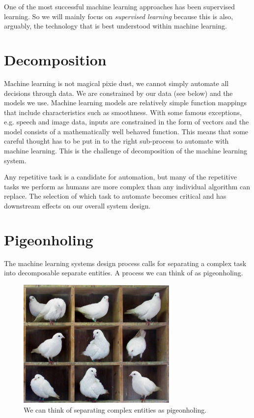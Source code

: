 \documentclass[a4paper]{caesar_book}
\begin{document}
One of the most successful machine learning approaches has been supervised learning. So we will mainly focus on \textit{supervised learning} because this is also, arguably, the technology that is best understood within machine learning.

\section{Decomposition}

Machine learning is not magical pixie dust, we cannot simply automate all decisions through data. We are constrained by our data (see below) and the models we use. Machine learning models are relatively simple function mappings that include characteristics such as smoothness. With some famous exceptions, e.g. speech and image data, inputs are constrained in the form of vectors and the model consists of a mathematically well behaved function. This means that some careful thought has to be put in to the right sub-process to automate with machine learning. This is the challenge of decomposition of the machine learning system.

Any repetitive task is a candidate for automation, but many of the repetitive tasks we perform as humans are more complex than any individual algorithm can replace. The selection of which task to automate becomes critical and has downstream effects on our overall system design.

\section{Pigeonholing}

The machine learning systems design process calls for separating a complex task into decomposable separate entities. A process we can think of as pigeonholing.

\begin{figure}[htbp]%
	\includegraphics[height=180pt,width=\textwidth]{pictures/TooManyPigeons.jpg}%
	\caption*{We can think of separating complex entities as pigeonholing.}%
	\label{pigeonholing}%
\end{figure}%
\end{document}
